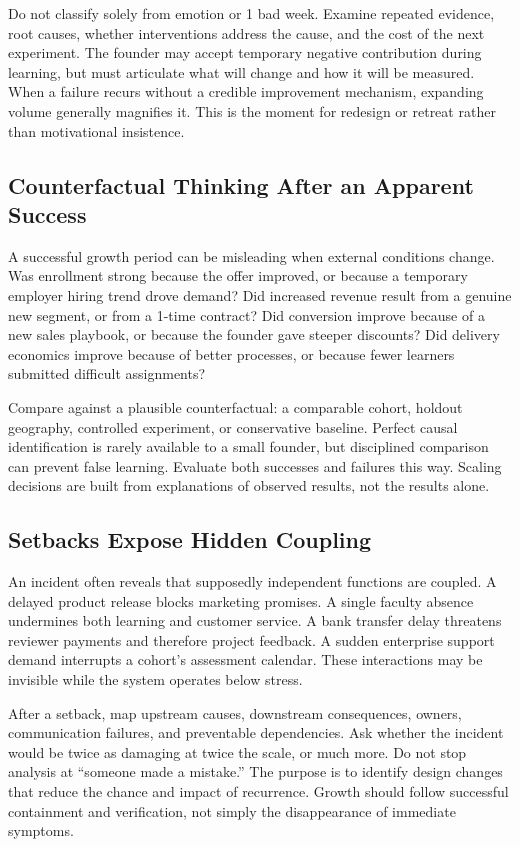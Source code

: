 Do not classify solely from emotion or 1 bad week. Examine repeated evidence, root causes, whether interventions address the cause, and the cost of the next experiment. The founder may accept temporary negative contribution during learning, but must articulate what will change and how it will be measured. When a failure recurs without a credible improvement mechanism, expanding volume generally magnifies it. This is the moment for redesign or retreat rather than motivational insistence.

\subsection{Counterfactual Thinking After an Apparent Success}
\label{sec:counterfactual_thinking_success}

A successful growth period can be misleading when external conditions change. Was enrollment strong because the offer improved, or because a temporary employer hiring trend drove demand? Did increased revenue result from a genuine new segment, or from a 1-time contract? Did conversion improve because of a new sales playbook, or because the founder gave steeper discounts? Did delivery economics improve because of better processes, or because fewer learners submitted difficult assignments?

Compare against a plausible counterfactual: a comparable cohort, holdout geography, controlled experiment, or conservative baseline. Perfect causal identification is rarely available to a small founder, but disciplined comparison can prevent false learning. Evaluate both successes and failures this way. Scaling decisions are built from explanations of observed results, not the results alone.

\subsection{Setbacks Expose Hidden Coupling}
\label{sec:setbacks_expose_hidden_coupling}

An incident often reveals that supposedly independent functions are coupled. A delayed product release blocks marketing promises. A single faculty absence undermines both learning and customer service. A bank transfer delay threatens reviewer payments and therefore project feedback. A sudden enterprise support demand interrupts a cohort's assessment calendar. These interactions may be invisible while the system operates below stress.

After a setback, map upstream causes, downstream consequences, owners, communication failures, and preventable dependencies. Ask whether the incident would be twice as damaging at twice the scale, or much more. Do not stop analysis at ``someone made a mistake.'' The purpose is to identify design changes that reduce the chance and impact of recurrence. Growth should follow successful containment and verification, not simply the disappearance of immediate symptoms.


